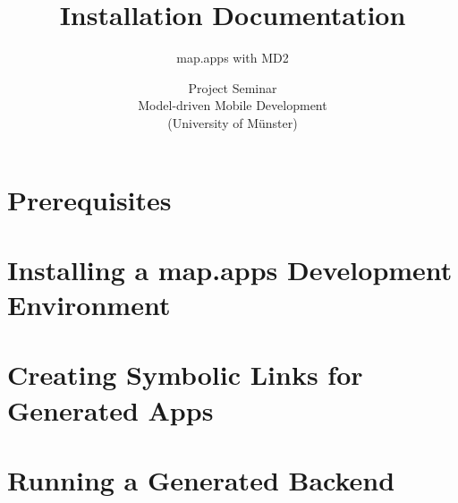 \documentclass[a4paper, 12pt, titlepage, headsepline, listof = totoc, bibliography = totoc, numbers = noenddot]{scrartcl} %
\title{Installation Documentation}
\subtitle{map.apps with MD2}
\author{Project Seminar\\
Model-driven Mobile Development\\
(University of Münster)}
\begin{document}
	

\thispagestyle{empty}
\maketitle


\thispagestyle{empty}
\tableofcontents


\clearpage
\setcounter{page}{1}


\section{Prerequisites}


\section{Installing a map.apps Development Environment}


\section{Creating Symbolic Links for Generated Apps}


\section{Running a Generated Backend}




\clearpage
\appendix
{}		%
%




\setcounter{secnumdepth}{0}





%
%

\end{document}
